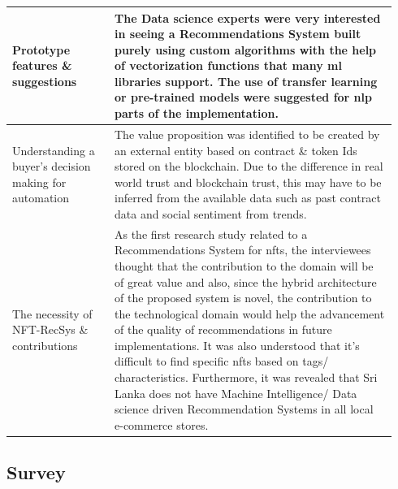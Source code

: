 \begin{longtable}{|p{0.25\linewidth}|p{0.69\linewidth}|}
\hline
Prototype features \& suggestions & The Data science experts were very interested in seeing a Recommendations System built purely using custom algorithms with the help of vectorization functions that many \gls{ml} libraries support. The use of transfer learning or pre-trained models were suggested for \gls{nlp} parts of the implementation.\\ 
\hline
Understanding a buyer's decision making for automation & The value proposition was identified to be created by an external entity based on contract \& token Ids stored on the blockchain. Due to the difference in real world trust and blockchain trust, this may have to be inferred from the available data such as past contract data and social sentiment from trends. \\ 
\hline
The necessity of NFT-RecSys \& contributions & As the first research study related to a Recommendations System for \gls{nft}s, the interviewees thought that the contribution to the domain will be of great value and also, since the hybrid architecture of the proposed system is novel, the contribution to the technological domain would help the advancement of the quality of recommendations in future implementations. It was also understood that it's difficult to find specific \gls{nft}s based on tags/ characteristics.
Furthermore, it was revealed that Sri Lanka does not have Machine Intelligence/ Data science driven Recommendation Systems in all local e-commerce stores.
\\ 
\hline

\end{longtable}


\subsection{Survey}


